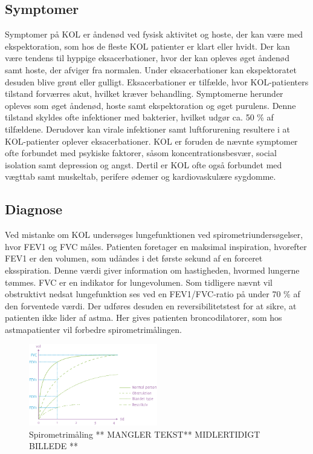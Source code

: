 \subsection{Symptomer}
Symptomer på KOL er åndenød ved fysisk aktivitet og hoste, der kan være med ekspektoration, som hos de fleste KOL patienter er klart eller hvidt. Der kan være tendens til hyppige eksacerbationer, hvor der kan opleves øget åndenød samt hoste, der afviger fra normalen. Under eksacerbationer kan ekspektoratet desuden blive grønt eller gulligt.\cite{Basisbogen2016}
Eksacerbationer er tilfælde, hvor KOL-patienters tilstand forværres akut, hvilket kræver behandling. Symptomerne herunder opleves som øget åndenød, hoste samt ekspektoration og øget purulens. Denne tilstand skyldes ofte infektioner med bakterier, hvilket udgør ca. 50 \% af tilfældene. Derudover kan virale infektioner samt luftforurening resultere i at KOL-patienter oplever eksacerbationer.\cite{Basisbogen2016, dsam2016}
KOL er foruden de nævnte symptomer ofte forbundet med psykiske faktorer, såsom koncentrationsbesvær, social isolation samt depression og angst. Dertil er KOL ofte også forbundet med vægttab samt muskeltab, perifere ødemer og kardiovaskulære sygdomme. \cite{dsam2016,McCarthy2015}


\subsection{Diagnose}
Ved mistanke om KOL undersøges lungefunktionen ved spirometriundersøgelser, hvor FEV1 og FVC måles. Patienten foretager en maksimal inspiration, hvorefter FEV1 er den volumen, som udåndes i det første sekund af en forceret eksspiration. Denne værdi giver information om hastigheden, hvormed lungerne tømmes. FVC er en indikator for lungevolumen. Som tidligere nævnt vil obstruktivt nedsat lungefunktion ses ved en FEV1/FVC-ratio på under 70 \% af den forventede værdi. Der udføres desuden en reversibilitetstest for at sikre, at patienten ikke lider af astma. Her gives patienten broncodilatorer, som hos astmapatienter vil forbedre spirometrimålingen.\cite{Basisbogen2016, Sundhed2013} 

\begin{figure} [H]
\centering
\includegraphics[width=0.5\textwidth]{figures/FEV}
\caption{Spirometrimåling ** MANGLER TEKST** MIDLERTIDIGT BILLEDE **}
\label{fig:FEV}
\end{figure} 

